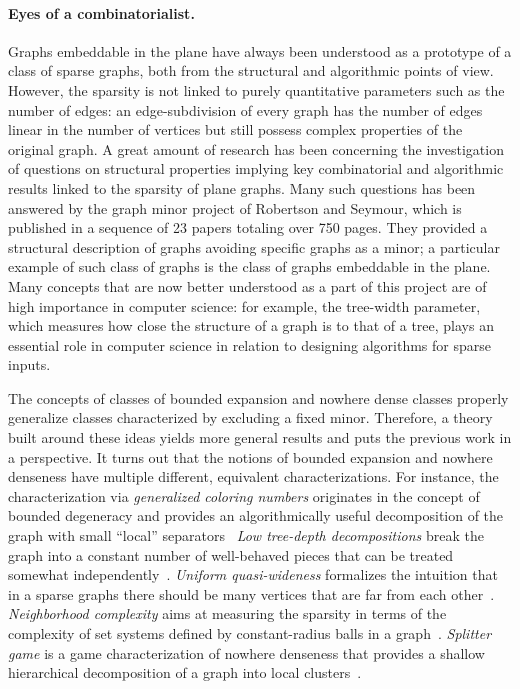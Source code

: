 \paragraph*{Eyes of a combinatorialist.}
Graphs embeddable in the plane have always been understood as a prototype of a class of sparse graphs,
both from the structural and algorithmic points of view.
However, the sparsity is not linked to purely quantitative parameters such as the number of edges:
an edge-subdivision of every graph has the number of edges linear in the number of vertices
but still possess complex properties of the original graph.
A great amount of research has been concerning the investigation of questions on structural properties
implying key combinatorial and algorithmic results linked to the sparsity of plane graphs.
Many such questions has been answered by the graph minor project of Robertson and Seymour,
which is published in a sequence of 23 papers totaling over 750 pages.
They provided a structural description of graphs avoiding specific graphs as a minor;
a particular example of such class of graphs is the class of graphs embeddable in the plane.
Many concepts that are now better understood as a part of this project are of high importance in computer science:
for example, the tree-width parameter, which measures how close the structure of a graph is to that of a tree,
plays an essential role in computer science in relation to designing algorithms for sparse inputs.

The concepts of classes of bounded expansion and nowhere dense classes properly generalize classes characterized by excluding a fixed minor.
Therefore, a theory built around these ideas yields more general results and puts the previous work in a perspective.
It turns out that the notions of bounded expansion and nowhere denseness have multiple different, equivalent characterizations.
For instance, the characterization via {\em{generalized coloring numbers}} originates in the concept of bounded degeneracy and provides an algorithmically useful decomposition of the graph with small ``local''
separators~\cite{Zhu09}
{\em{Low tree-depth decompositions}} break the graph into a constant number of well-behaved pieces that can be treated somewhat independently~\cite{NesetrilM08a}.
{\em{Uniform quasi-wideness}} formalizes the intuition that in a sparse graphs there should be many vertices that are far from each other~\cite{nevsetvril2010first}.
{\em{Neighborhood complexity}} aims at measuring the sparsity in terms of the complexity of set systems defined by constant-radius balls in a graph~\cite{ReidlVS19}.
{\em{Splitter game}} is a game characterization of nowhere denseness that provides a shallow hierarchical decomposition of a graph into local clusters~\cite{grohe2017deciding}.

